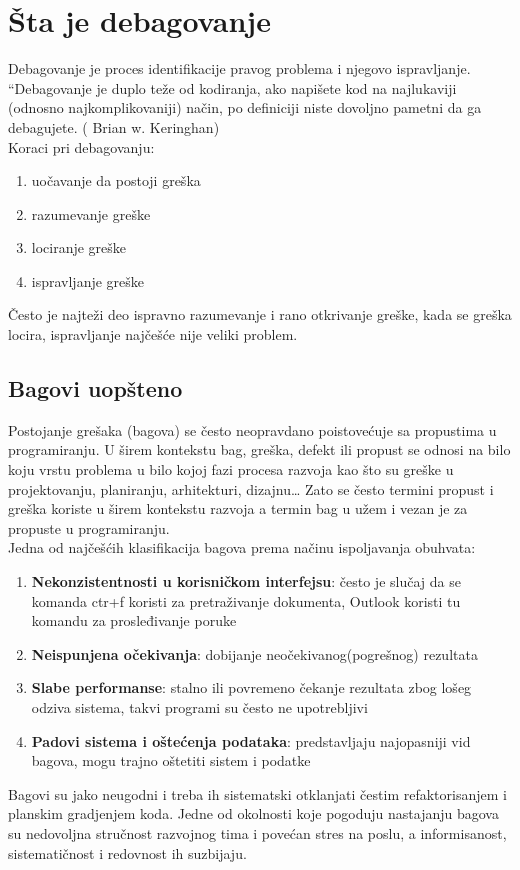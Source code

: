 \documentclass[a4paper]{article}
\begin{document}
\section{Šta je debagovanje}
\label{sec:sta je debagovanje}

Debagovanje je proces identifikacije pravog problema i njegovo ispravljanje.
“Debagovanje je duplo teže od kodiranja, ako napišete kod na najlukaviji (odnosno najkomplikovaniji) način, po definiciji niste dovoljno pametni da ga debagujete. ( Brian w. Keringhan) \cite{debagovanje_vladaf}\\
Koraci pri debagovanju\cite{bagovi_smalkov}:
\begin{enumerate}
\item uočavanje da postoji greška
\item razumevanje greške
\item lociranje greške
\item ispravljanje greške
\end{enumerate}
Često je najteži deo ispravno razumevanje i rano otkrivanje greške, kada se greška locira, ispravljanje najčešće nije veliki problem.


\subsection{Bagovi uopšteno}
\label{subsec:podnaslov1}

Postojanje grešaka (bagova) se često neopravdano poistovećuje sa propustima u programiranju.
U širem kontekstu bag, greška, defekt ili propust se odnosi na bilo koju vrstu problema u bilo kojoj fazi procesa razvoja kao što su greške u projektovanju, planiranju, arhitekturi, dizajnu…
Zato se često termini propust i greška koriste u širem kontekstu razvoja a termin bag u užem i vezan je za propuste u programiranju.\\
\indent Jedna od najčešćih klasifikacija bagova prema načinu ispoljavanja obuhvata:
\begin{enumerate}
	\item \textbf{Nekonzistentnosti u korisničkom interfejsu}: često je slučaj da se komanda ctr+f koristi za pretraživanje dokumenta, Outlook koristi   
	tu komandu za prosleđivanje poruke
	\item \textbf{Neispunjena očekivanja}: dobijanje neočekivanog(pogrešnog) rezultata
	\item \textbf{Slabe performanse}: stalno ili povremeno čekanje rezultata zbog lošeg odziva sistema, takvi programi su često ne upotrebljivi
	\item \textbf{Padovi sistema i oštećenja podataka}: predstavljaju najopasniji vid bagova, mogu trajno oštetiti sistem i podatke
\end{enumerate}
\indent Bagovi su jako neugodni i treba ih sistematski otklanjati čestim refaktorisanjem i planskim gradjenjem koda. Jedne od okolnosti koje pogoduju nastajanju bagova su nedovoljna stručnost razvojnog tima i povećan stres na poslu, a informisanost, sistematičnost i redovnost ih suzbijaju. \cite{bagovi_smalkov}
\end{document}
